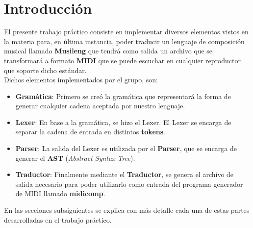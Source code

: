 \section{Introducción}

El presente trabajo práctico consiste en implementar diversos elementos vistos en la materia para, en última instancia, poder traducir un lenguaje de composición musical llamado \textbf{Musileng} que tendrá como salida un archivo que se transformará a formato \textbf{MIDI} que se puede escuchar en cualquier reproductor que soporte dicho estándar.\\

Dichos elementos implementados por el grupo, son:
\begin{itemize}
	\item \textbf{Gramática}: Primero se creó la gramática que representará la forma de generar cualquier cadena aceptada por nuestro lenguaje.
	\item \textbf{Lexer}: En base a la gramática, se hizo el Lexer. El Lexer se encarga de separar la cadena de entrada en distintos \textbf{tokens}.
	\item \textbf{Parser}: La salida del Lexer es utilizada por el \textbf{Parser}, que se encarga de generar el \textbf{AST} (\textit{Abstract Syntax Tree}).
	\item \textbf{Traductor}: Finalmente mediante el \textbf{Traductor}, se genera el archivo de salida necesario para poder utilizarlo como entrada del programa generador de MIDI llamado \textbf{midicomp}.
\end{itemize}

En las secciones subsiguientes se explica con más detalle cada una de estas partes desarrolladas en el trabajo práctico.

\clearpage
